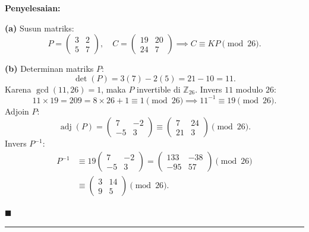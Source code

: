 \documentclass[11pt,a4paper]{article}
\newenvironment{solusi}{\noindent\textbf{\textsf{Penyelesaian:}}\par\vspace{0.2em}}{\hfill$\blacksquare$\vspace{1em}\par\hrule\vspace{1em}}
\begin{document}
\begin{solusi}
\textbf{(a)} Susun matriks:
\[
P = \begin{pmatrix} 3 & 2 \\ 5 & 7 \end{pmatrix}, \quad C = \begin{pmatrix} 19 & 20 \\ 24 & 7 \end{pmatrix} \implies C \equiv K P \pmod{26}.
\]

\textbf{(b)} Determinan matriks $P$:
\[
\det(P) = 3(7) - 2(5) = 21 - 10 = 11.
\]
Karena $\gcd(11, 26) = 1$, maka $P$ invertible di $\mathbb{Z}_{26}$.
Invers $11$ modulo $26$:
\[
11 \times 19 = 209 = 8 \times 26 + 1 \equiv 1 \pmod{26} \implies 11^{-1} \equiv 19 \pmod{26}.
\]
Adjoin $P$:
\[
\operatorname{adj}(P) = \begin{pmatrix} 7 & -2 \\ -5 & 3 \end{pmatrix} \equiv \begin{pmatrix} 7 & 24 \\ 21 & 3 \end{pmatrix} \pmod{26}.
\]
Invers $P^{-1}$:
\begin{align*}
P^{-1} &\equiv 19 \begin{pmatrix} 7 & -2 \\ -5 & 3 \end{pmatrix} = \begin{pmatrix} 133 & -38 \\ -95 & 57 \end{pmatrix} \pmod{26} \\
&\equiv \begin{pmatrix} 3 & 14 \\ 9 & 5 \end{pmatrix} \pmod{26}.
\end{align*}


\end{solusi}
\end{document}
